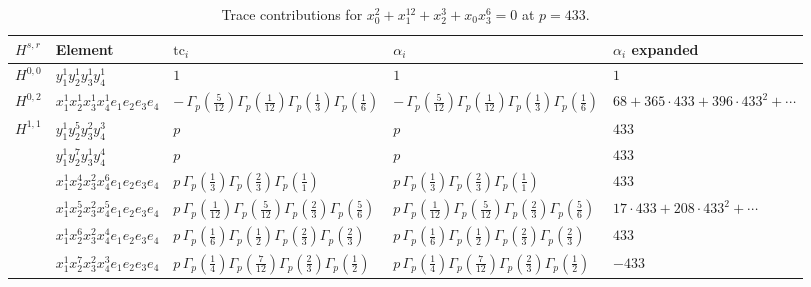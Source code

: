 \documentclass[11pt]{article}
\begin{document}
\begin{table}[ht]
\centering
\caption{Trace contributions for $x_0^{2} + x_1^{12} + x_2^{3} + x_0 x_3^{6} = 0$ at $p=433$.}\label{tab:deformed-22}
\renewcommand{\arraystretch}{1.1}
{\scriptsize
\begin{tabular}{@{}lllll@{}}
\toprule
$H^{s,r}$ & Element & $\mathrm{tc}_i$ & $\alpha_i$ & $\alpha_i$ expanded \\
\midrule
$H^{0,0}$ & $y_{1}^{1} y_{2}^{1} y_{3}^{1} y_{4}^{1}$ & $1$ & $1$ & $1$ \\
\midrule
$H^{0,2}$ & $x_{1}^{1} x_{2}^{1} x_{3}^{1} x_{4}^{1}  e_{1} e_{2} e_{3} e_{4}$ & $- \, \Gamma_p \left( \frac{5}{12} \right) \Gamma_p \left( \frac{1}{12} \right) \Gamma_p \left( \frac{1}{3} \right) \Gamma_p \left( \frac{1}{6} \right)$ & $- \, \Gamma_p \left( \frac{5}{12} \right) \Gamma_p \left( \frac{1}{12} \right) \Gamma_p \left( \frac{1}{3} \right) \Gamma_p \left( \frac{1}{6} \right)$ & $68{+}365{\cdot}433{+}396{\cdot}433^{2}{+}\cdots$ \\
\midrule
$H^{1,1}$ & $y_{1}^{1} y_{2}^{5} y_{3}^{2} y_{4}^{3}$ & $p \,$ & $p \,$ & $433$ \\
 & $y_{1}^{1} y_{2}^{7} y_{3}^{1} y_{4}^{4}$ & $p \,$ & $p \,$ & $433$ \\
 & $x_{1}^{1} x_{2}^{4} x_{3}^{2} x_{4}^{6}  e_{1} e_{2} e_{3} e_{4}$ & $p \, \Gamma_p \left( \frac{1}{3} \right) \Gamma_p \left( \frac{2}{3} \right) \Gamma_p \left( \frac{1}{1} \right)$ & $p \, \Gamma_p \left( \frac{1}{3} \right) \Gamma_p \left( \frac{2}{3} \right) \Gamma_p \left( \frac{1}{1} \right)$ & $433$ \\
 & $x_{1}^{1} x_{2}^{5} x_{3}^{2} x_{4}^{5}  e_{1} e_{2} e_{3} e_{4}$ & $p \, \Gamma_p \left( \frac{1}{12} \right) \Gamma_p \left( \frac{5}{12} \right) \Gamma_p \left( \frac{2}{3} \right) \Gamma_p \left( \frac{5}{6} \right)$ & $p \, \Gamma_p \left( \frac{1}{12} \right) \Gamma_p \left( \frac{5}{12} \right) \Gamma_p \left( \frac{2}{3} \right) \Gamma_p \left( \frac{5}{6} \right)$ & $17{\cdot}433{+}208{\cdot}433^{2}{+}\cdots$ \\
 & $x_{1}^{1} x_{2}^{6} x_{3}^{2} x_{4}^{4}  e_{1} e_{2} e_{3} e_{4}$ & $p \, \Gamma_p \left( \frac{1}{6} \right) \Gamma_p \left( \frac{1}{2} \right) \Gamma_p \left( \frac{2}{3} \right) \Gamma_p \left( \frac{2}{3} \right)$ & $p \, \Gamma_p \left( \frac{1}{6} \right) \Gamma_p \left( \frac{1}{2} \right) \Gamma_p \left( \frac{2}{3} \right) \Gamma_p \left( \frac{2}{3} \right)$ & $433$ \\
 & $x_{1}^{1} x_{2}^{7} x_{3}^{2} x_{4}^{3}  e_{1} e_{2} e_{3} e_{4}$ & $p \, \Gamma_p \left( \frac{1}{4} \right) \Gamma_p \left( \frac{7}{12} \right) \Gamma_p \left( \frac{2}{3} \right) \Gamma_p \left( \frac{1}{2} \right)$ & $p \, \Gamma_p \left( \frac{1}{4} \right) \Gamma_p \left( \frac{7}{12} \right) \Gamma_p \left( \frac{2}{3} \right) \Gamma_p \left( \frac{1}{2} \right)$ & $-433$ \\

\end{tabular}}
\end{table}
\end{document}
